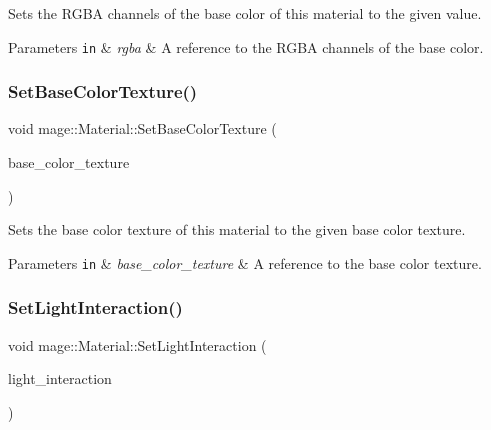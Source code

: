 Sets the R\+G\+BA channels of the base color of this material to the given value.


\begin{DoxyParams}[1]{Parameters}
\mbox{\tt in}  & {\em rgba} & A reference to the R\+G\+BA channels of the base color. \\
\hline
\end{DoxyParams}
\hypertarget{structmage_1_1_material_add87c1ebf7783980ac21e986c080505b}{}\label{structmage_1_1_material_add87c1ebf7783980ac21e986c080505b} 
\subsubsection{\texorpdfstring{Set\+Base\+Color\+Texture()}{SetBaseColorTexture()}}
{\footnotesize\ttfamily void mage\+::\+Material\+::\+Set\+Base\+Color\+Texture (\begin{DoxyParamCaption}\item[{const \hyperlink{namespacemage_a1e01ae66713838a7a67d30e44c67703e}{Shared\+Ptr}$<$ const \hyperlink{classmage_1_1_texture}{Texture} $>$ \&}]{base\+\_\+color\+\_\+texture }\end{DoxyParamCaption})}

Sets the base color texture of this material to the given base color texture.


\begin{DoxyParams}[1]{Parameters}
\mbox{\tt in}  & {\em base\+\_\+color\+\_\+texture} & A reference to the base color texture. \\
\hline
\end{DoxyParams}
\hypertarget{structmage_1_1_material_a9b0bcb448cf9c96bcb63dcbc0f110bd1}{}\label{structmage_1_1_material_a9b0bcb448cf9c96bcb63dcbc0f110bd1} 
\subsubsection{\texorpdfstring{Set\+Light\+Interaction()}{SetLightInteraction()}}
{\footnotesize\ttfamily void mage\+::\+Material\+::\+Set\+Light\+Interaction (\begin{DoxyParamCaption}\item[{bool}]{light\+\_\+interaction }\end{DoxyParamCaption})\hspace{0.3cm}{\ttfamily [noexcept]}}

